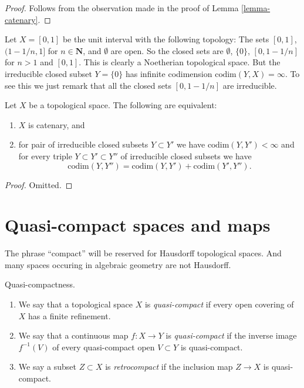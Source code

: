 \begin{proof}
Follows from the observation made in the proof of
Lemma \ref{lemma-catenary}.
\end{proof}

\begin{example}
\label{example-Noetherian-infinite-codimension}
Let $X = [0, 1]$ be the unit interval with the following
topology: The sets $[0, 1]$, $(1 - 1/n, 1]$ for $n \in \mathbf{N}$, and
$\emptyset$ are open. So the closed sets are
$\emptyset$, $\{0\}$, $[0, 1 - 1/n]$ for $n > 1$ and $[0, 1]$.
This is clearly a Noetherian topological space.
But the irreducible closed subset $Y = \{0\}$ has infinite
codimension $\text{codim}(Y, X) = \infty$.
To see this we just remark that all the closed sets
$[0, 1 - 1/n]$ are irreducible.
\end{example}

\begin{lemma}
\label{lemma-catenary-in-codimension}
Let $X$ be a topological space. The following are equivalent:
\begin{enumerate}
\item $X$ is catenary, and
\item for pair of irreducible closed subsets $Y \subset Y'$ we have
$\text{codim}(Y, Y') < \infty$ and for every triple
$Y \subset Y' \subset Y''$ of irreducible closed subsets we have
$$
\text{codim}(Y, Y'') = \text{codim}(Y, Y') + \text{codim}(Y', Y'').
$$
\end{enumerate}
\end{lemma}

\begin{proof}
Omitted.
\end{proof}







\section{Quasi-compact spaces and maps}
\label{section-quasi-compact}

\noindent
The phrase ``compact'' will be reserved
for Hausdorff topological spaces. And many spaces occuring
in algebraic geometry are not Hausdorff.

\begin{definition}
\label{definition-quasi-compact}
Quasi-compactness.
\begin{enumerate}
\item We say that a topological space $X$ is {\it quasi-compact}
if every open covering of $X$ has a finite refinement.
\item We say that a continuous map $f : X \to Y$ is {\it quasi-compact}
if the inverse image $f^{-1}(V)$ of every quasi-compact open $V \subset Y$
is quasi-compact.
\item We say a subset $Z \subset X$ is {\it retrocompact}
if the inclusion map $Z \to X$ is quasi-compact.
\end{enumerate}
\end{definition}

